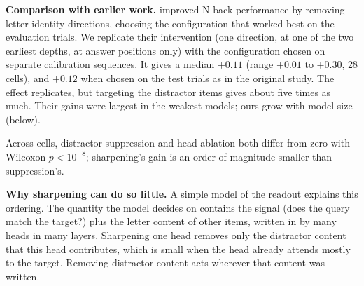 \documentclass{article}
\begin{document}
\textbf{Comparison with earlier work.} \citet{xiong2026superposition} improved N-back performance by removing letter-identity directions, choosing the configuration that worked best on the evaluation trials. We replicate their intervention (one direction, at one of the two earliest depths, at answer positions only) with the configuration chosen on separate calibration sequences. It gives a median $+0.11$ (range $+0.01$ to $+0.30$, 28 cells), and $+0.12$ when chosen on the test trials as in the original study. The effect replicates, but targeting the distractor items gives about five times as much. Their gains were largest in the weakest models; ours grow with model size (below).

Across cells, distractor suppression and head ablation both differ from zero with Wilcoxon $p<10^{-8}$; sharpening's gain is an order of magnitude smaller than suppression's.

\textbf{Why sharpening can do so little.} A simple model of the readout explains this ordering. The quantity the model decides on contains the signal (does the query match the target?) plus the letter content of other items, written in by many heads in many layers. Sharpening one head removes only the distractor content that this head contributes, which is small when the head already attends mostly to the target. Removing distractor content acts wherever that content was written.
\end{document}
